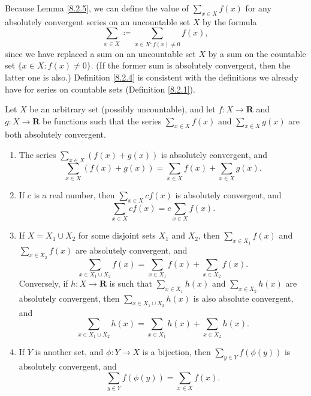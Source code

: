 \begin{note}
    Because Lemma \ref{8.2.5}, we can define the value of \(\sum_{x \in X} f(x)\) for any absolutely convergent series on an uncountable set \(X\) by the formula
    \[
        \sum_{x \in X} \coloneqq \sum_{x \in X : f(x) \neq 0} f(x),
    \]
    since we have replaced a sum on an uncountable set \(X\) by a sum on the countable set \(\{x \in X : f(x) \neq 0\}\).
    (If the former sum is absolutely convergent, then the latter one is also.)
    Definition \ref{8.2.4} is consistent with the definitions we already have for series on countable sets (Definition \ref{8.2.1}).
\end{note}

\begin{proposition}\label{8.2.6}
    Let \(X\) be an arbitrary set (possibly uncountable), and let \(f : X \to \mathbf{R}\) and \(g : X \to \mathbf{R}\) be functions such that the series \(\sum_{x \in X} f(x)\) and \(\sum_{x \in X} g(x)\) are both absolutely convergent.
    \begin{enumerate}
        \item The series \(\sum_{x \in X} (f(x) + g(x))\) is absolutely convergent, and
              \[
                  \sum_{x \in X} (f(x) + g(x)) = \sum_{x \in X} f(x) + \sum_{x \in X} g(x).
              \]
        \item If \(c\) is a real number, then \(\sum_{x \in X} cf(x)\) is absolutely convergent, and
              \[
                  \sum_{x \in X} cf(x) = c \sum_{x \in X} f(x).
              \]
        \item If \(X = X_1 \cup X_2\) for some disjoint sets \(X_1\) and \(X_2\), then \(\sum_{x \in X_1} f(x)\) and \(\sum_{x \in X_2} f(x)\) are absolutely convergent, and
              \[
                  \sum_{x \in X_1 \cup X_2} f(x) = \sum_{x \in X_1} f(x) + \sum_{x \in X_2} f(x).
              \]
              Conversely, if \(h : X \to \mathbf{R}\) is such that \(\sum_{x \in X_1} h(x)\) and \(\sum_{x \in X_2} h(x)\) are absolutely convergent, then \(\sum_{x \in X_1 \cup X_2} h(x)\) is also absolute convergent, and
              \[
                  \sum_{x \in X_1 \cup X_2} h(x) = \sum_{x \in X_1} h(x) + \sum_{x \in X_2} h(x).
              \]
        \item If \(Y\) is another set, and \(\phi : Y \to X\) is a bijection, then \(\sum_{y \in Y} f(\phi(y))\) is absolutely convergent, and
              \[
                  \sum_{y \in Y} f(\phi(y)) = \sum_{x \in X} f(x).
              \]
    \end{enumerate}
\end{proposition}

